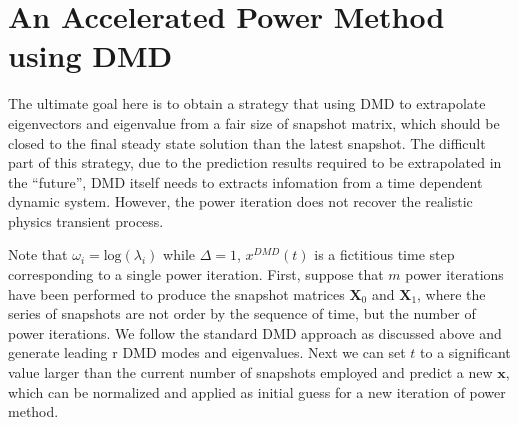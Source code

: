 \section{An Accelerated Power Method using DMD}
\label{sec:dmdpi}
The ultimate goal here is to obtain a strategy that using DMD to extrapolate eigenvectors and eigenvalue from a fair size of snapshot matrix, which should be closed to the final steady state solution than the latest snapshot.
The difficult part of this strategy, due to the prediction results required to be extrapolated in the ``future'', DMD itself needs to extracts infomation from a time dependent dynamic system.
However, the power iteration does not recover the realistic physics transient process. 

Note that $\omega_i= \text{log}(\lambda_i)$ while $\Delta = 1$, $x^{DMD}(t)$ is a fictitious time step corresponding to a single power iteration.
First, suppose that $m$ power iterations have been performed to produce the snapshot matrices $\mathbf{X}_0$ and $\mathbf{X}_1$, where the series of snapshots are not order by the sequence of time, but the number of power iterations.
We follow the standard DMD approach as discussed above and generate leading r DMD modes and eigenvalues.
Next we can set $t$ to a significant value larger than the current number of snapshots employed and predict a new $\mathbf{x}$, which can be normalized and applied as initial guess for a new iteration of power method.

